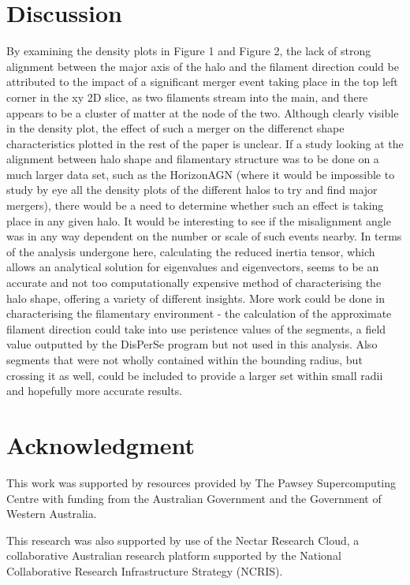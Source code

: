 \documentclass[journal]{IEEEtran}
\begin{document}
\section{Discussion}
By examining the density plots in Figure 1 and Figure 2, the lack of strong alignment between the major axis of the halo and the filament direction could be attributed to the impact of a significant merger event taking place in the top left corner in the xy 2D slice, as two filaments stream into the main, and there appears to be a cluster of matter at the node of the two. Although clearly visible in the density plot, the effect of such a merger on the differenct shape characteristics plotted in the rest of the paper is unclear. If a study looking at the alignment between halo shape and filamentary structure was to be done on a much larger data set, such as the HorizonAGN (where it would be impossible to study by eye all the density plots of the different halos to try and find major mergers), there would be a need to determine whether such an effect is taking place in any given halo. It would be interesting to see if the misalignment angle was in any way dependent on the number or scale of such events nearby. 
In terms of the analysis undergone here, calculating the reduced inertia tensor, which allows an analytical solution for eigenvalues and eigenvectors, seems to be an accurate and not too computationally expensive method of characterising the halo shape, offering a variety of different insights. More work could be done in characterising the filamentary environment - the calculation of the approximate filament direction could take into use peristence values of the segments, a field value outputted by the DisPerSe program but not used in this analysis. Also segments that were not wholly contained within the bounding radius, but crossing it as well, could be included to provide a larger set within small radii and hopefully more accurate results. 

\section*{Acknowledgment}
This work was supported by resources provided by The Pawsey Supercomputing Centre with funding from the Australian Government and the Government of Western Australia.

This research was also supported by use of the Nectar Research Cloud, a collaborative Australian research platform supported by the National Collaborative Research Infrastructure Strategy (NCRIS).
\end{document}
